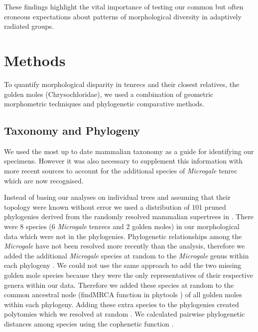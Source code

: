 \documentclass[12pt,a4paper]{article}
\begin{document}
These findings highlight the vital importance of testing our common but often eroneous expectations about patterns of morphological diversity in adaptively radiated groups. 


\section{Methods}
To quantify morphological disparity in tenrecs and their closest relatives, the golden moles (Chrysochloridae), we used a combination of geometric morphometric techniques and phylogenetic comparative methods. 

\subsection{Taxonomy and Phylogeny}
We used the most up to date mammalian taxonomy \citep{Wilson2005} as a guide for identifying our specimens. However it was also necessary to supplement this information with more recent sources \citep{IUCN2012, Olson2013} to account for the additional species of \textit{Microgale} tenrec \citep{Olson2004, Goodman2006, Olson2009} which are now recognised. 


Instead of basing our analyses on individual trees and assuming that their topology were known without error 
\citep[e.g.][]{Ruta2013, Foth2012, Brusatte2008, Harmon2003} we used a distribution of 101 pruned phylogenies derived from the randomly resolved mammalian supertrees in \citep{Kuhn2011}. 
There were 8 species (6 \textit{Microgale} tenrecs and 2 golden moles) in our morphological data which were not in the phylogenies. Phylogenetic relationships among the \textit{Microgale} have not been resolved more recently than the \citep{Kuhn2011} analysis, therefore we added the additional \textit{Microgale} species at random to the \textit{Microgale} genus within each phylogeny \citep{Revell2012}. We could not use the same approach to add the two missing golden mole species because they were the only representatives of their respective genera within our data. Therefore we added these species at random to the common ancestral node (findMRCA function in phytools \citep{Revell2012}) of all golden moles within each phylogeny. Adding these extra species to the phylogenies created polytomies which we resolved at random \citep{Paradis2004}. We calculated pairwise phylogenetic distances among species using the cophenetic function \citep[R Development Core][]{Team2013}. 
\end{document}
